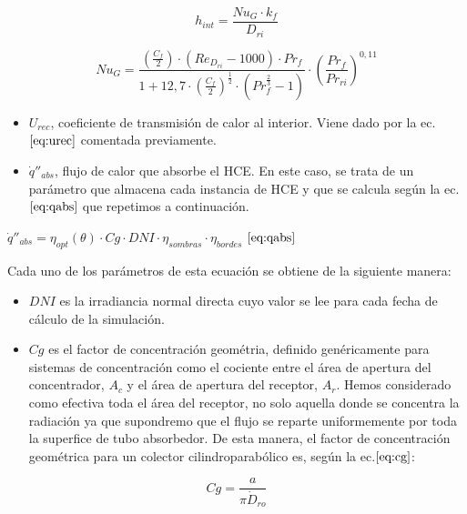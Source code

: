 \begin{equation}
    h_{int} = \frac{Nu_{G}\cdot k_f }{D_{ri}}
    \label{eq:hint}
\end{equation}

\begin{equation}
    Nu_{G} = \frac{ \left( \frac{C_f}{2} \right)\cdot\left( Re_{D_{ri}} - 1000 \right)\cdot Pr_f }{1 + 12,7 \cdot \left(\frac{C_f}{2} \right)^{\frac{1}{2}}\cdot \left(Pr^{\frac{2}{3}}_f -1 \right)} \cdot \left( \frac{Pr_f}{Pr_{ri}} \right)^{0,11}
    \label{eq:nug}
\end{equation}

\begin{itemize}
\item
  \(U_{rec}\), coeficiente de transmisión de calor al interior. Viene
  dado por la ec.\(\eqref{eq:urec}\) comentada previamente.
\item
  \(\dot q''_{abs}\), flujo de calor que absorbe el HCE. En este caso,
  se trata de un parámetro que almacena cada instancia de HCE y que se
  calcula según la ec.\(\eqref{eq:qabs}\) que repetimos a continuación.
\end{itemize}

\(\dot q''_{abs}= \eta_{opt}(\theta) \cdot Cg \cdot DNI \cdot \eta_{sombras} \cdot \eta_{bordes}\)
\(\eqref{eq:qabs}\)

Cada uno de los parámetros de esta ecuación se obtiene de la siguiente
manera:

\begin{itemize}
\item
  \(DNI\) es la irradiancia normal directa cuyo valor se lee para cada
  fecha de cálculo de la simulación.
\item
  \(Cg\) es el factor de concentración geométria, definido genéricamente
  para sistemas de concentración como el cociente entre el área de
  apertura del concentrador, \(A_c\) y el área de apertura del receptor,
  \(A_r\). Hemos considerado como efectiva toda el área del receptor, no
  solo aquella donde se concentra la radiación ya que supondremo que el
  flujo se reparte uniformemente por toda la superfice de tubo
  absorbedor. De esta manera, el factor de concentración geométrica para
  un colector cilindroparabólico es, según la ec.\(\eqref{eq:cg}\):
\end{itemize}

\begin{equation}
   Cg = \frac{a}{\pi \dot D_{ro}}
    \label{eq:cg}
\end{equation}

